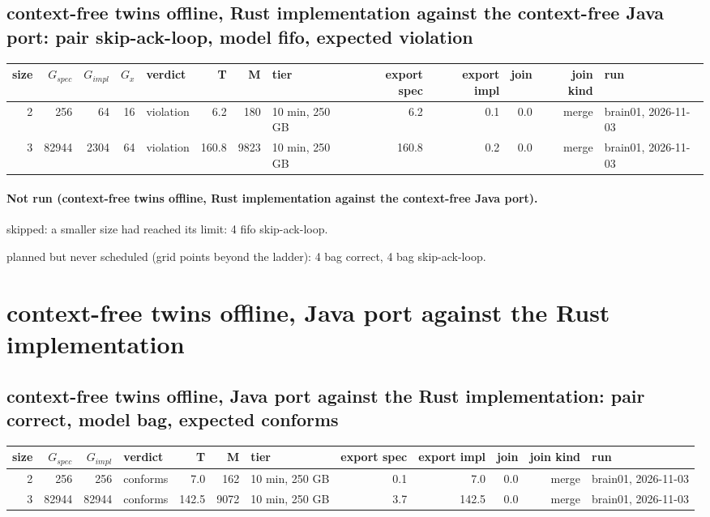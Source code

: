 \documentclass[10pt]{article}
\begin{document}
\subsection*{context-free twins offline, Rust implementation against the context-free Java port: pair \textsf{skip-ack-loop}, model fifo, expected violation}
\begin{longtable}{@{}rrrrlrrlrrrrl@{}}
\toprule
size & $G_{\mathit{spec}}$ & $G_{\mathit{impl}}$ & $G_x$ & verdict & T & M & tier & export spec & export impl & join & join kind & run \\
\midrule
\endhead
\color{blue} 2 & 256 & 64 & 16 & violation & 6.2 & 180 & 10 min, 250 GB & 6.2 & 0.1 & 0.0 & merge & brain01, 2026-11-03 \\
\color{blue} 3 & 82944 & 2304 & 64 & violation & 160.8 & 9823 & 10 min, 250 GB & 160.8 & 0.2 & 0.0 & merge & brain01, 2026-11-03 \\
\bottomrule
\end{longtable}
\paragraph{Not run (context-free twins offline, Rust implementation against the context-free Java port).}
skipped: a smaller size had reached its limit: 4 fifo skip-ack-loop.\par
planned but never scheduled (grid points beyond the ladder): 4 bag correct, 4 bag skip-ack-loop.\par
\section*{context-free twins offline, Java port against the Rust implementation}
\subsection*{context-free twins offline, Java port against the Rust implementation: pair \textsf{correct}, model bag, expected conforms}
\begin{longtable}{@{}rrrlrrlrrrrl@{}}
\toprule
size & $G_{\mathit{spec}}$ & $G_{\mathit{impl}}$ & verdict & T & M & tier & export spec & export impl & join & join kind & run \\
\midrule
\endhead
\color{blue} 2 & 256 & 256 & conforms & 7.0 & 162 & 10 min, 250 GB & 0.1 & 7.0 & 0.0 & merge & brain01, 2026-11-03 \\
\color{blue} 3 & 82944 & 82944 & conforms & 142.5 & 9072 & 10 min, 250 GB & 3.7 & 142.5 & 0.0 & merge & brain01, 2026-11-03 \\
\bottomrule
\end{longtable}
\end{document}
